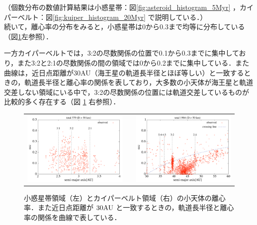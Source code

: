 \documentclass[11pt,a4paper,oneside,onecolumn]{jreport}
\begin{document}
（個数分布の数値計算結果は小惑星帯：図\ref{fig:asteroid_histogram_5Myr} ，カイパーベルト：図\ref{fig:kuiper_histogram_20Myr} で説明している．）
\\

続いて，離心率の分布をみると，小惑星帯は0から0.3まで均等に分布している（図\ref{fig:obs_ecc}左参照）．

一方カイパーベルトでは，3:2の尽数関係の位置で0.1から0.3までに集中しており，また3:2と2:1の尽数関係の間の領域では0から0.2までに集中している．また曲線は，近日点距離が30AU（海王星の軌道長半径とほぼ等しい）と一致するときの，軌道長半径と離心率の関係を表しており，大多数の小天体が海王星と軌道交差しない領域にいる中で，3:2の尽数関係の位置には軌道交差しているものが比較的多く存在する（図 \ref{fig:obs_ecc} 右参照）．

\begin{figure}[H]
\begin{tabular}{ccc}
\begin{minipage}[t]{0.45\hsize}
\centering
\includegraphics[width=8cm]{./image/mainbelt_ecc.pdf}
\end{minipage} &
\begin{minipage}[t]{0.1\hsize}
\end{minipage} &
\begin{minipage}[t]{0.45\hsize}
\centering
\includegraphics[width=8cm]{./image/kuiperbelt_ecc.pdf}
\end{minipage}\\
%
\end{tabular}
\caption{小惑星帯領域（左）とカイパーベルト領域（右）の小天体の離心率．また近日点距離が $30 {\rm AU}$ と一致するときの，軌道長半径と離心率の関係を曲線で表している．\label{fig:obs_ecc}}
\end{figure}
\end{document}
